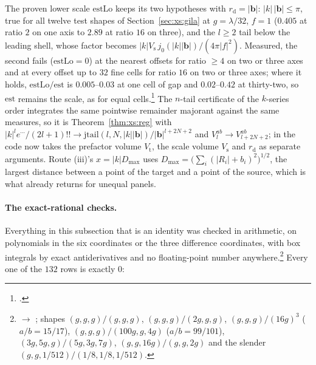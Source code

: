 \begin{remark}
\label{rem:xs:est}
The proven lower scale $\mathrm{estLo}$ keeps its two hypotheses with $r_{\mathrm{d}} = |\mathbf{b}|$:
$|k|\,|\mathbf{b}|\le\pi$, true for all twelve test shapes of Section~\ref{sec:xs:gila} at
$g = \lambda/32$, $f = 1$ ($0.405$ at ratio $2$ on one axis to $2.89$ at ratio $16$ on
three), and the $l\ge2$ tail below the leading shell, whose factor becomes
$|k|V_{\mathrm{s}}\,j_0(|k||\mathbf{b}|)/(4\pi|f|^2)$. Measured, the second fails
($\mathrm{estLo} = 0$) at the nearest offsets for ratio $\ge4$ on two or three axes and
at every offset up to $32$ fine cells for ratio $16$ on two or three axes; where it holds,
$\mathrm{estLo}/\mathrm{est}$ is $0.005$--$0.03$ at one cell of gap and $0.02$--$0.42$ at
thirty-two, so $\mathrm{est}$ remains the scale, as for equal cells.\footnote{.}
The $n$-tail certificate of the $k$-series order integrates the same pointwise remainder
majorant against the same measures, so it is Theorem~\ref{thm:xs:reg} with
$|k|^le^{\cdots}/(2l+1)!!\to\mathrm{jtail}(l,N,|k||\mathbf{b}|)/|\mathbf{b}|^{l+2N+2}$ and
$V^{ab}_l\to V^{ab}_{l+2N+2}$; in the code  now takes the prefactor volume
$V_{\mathrm{t}}$, the scale volume $V_{\mathrm{s}}$ and $r_{\mathrm{d}}$ as separate
arguments. Route (iii)'s $x = |k|D_{\max}$ uses
$D_{\max} = \bigl(\sum_i(|R_i|+b_i)^2\bigr)^{1/2}$, the largest distance between a point of
the target and a point of the source, which is what  already returns for
unequal panels.
\end{remark}

\paragraph{The exact-rational checks.} Everything in this subsection that is an identity
was checked in  arithmetic, on polynomials in the six coordinates
or the three difference coordinates, with box integrals by exact antiderivatives and no
floating-point number anywhere.\footnote{ $\to$
; shapes $(g,g,g)/(g,g,g)$, $(g,g,g)/(2g,g,g)$, $(g,g,g)/(16g)^3$
($a/b = 15/17$), $(g,g,g)/(100g,g,4g)$ ($a/b = 99/101$), $(3g,5g,g)/(5g,3g,7g)$,
$(g,g,16g)/(g,g,2g)$ and the slender $(g,g,1/512)/(1/8,1/8,1/512)$.} Every one of the
$132$ rows is exactly $0$:


